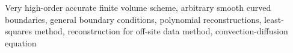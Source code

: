 \begin{chapterkeywords}
Very high-order accurate finite volume scheme, arbitrary smooth curved boundaries, general boundary conditions, polynomial reconstructions, least-squares method, reconstruction for off-site data method, convection-diffusion equation
\end{chapterkeywords}






